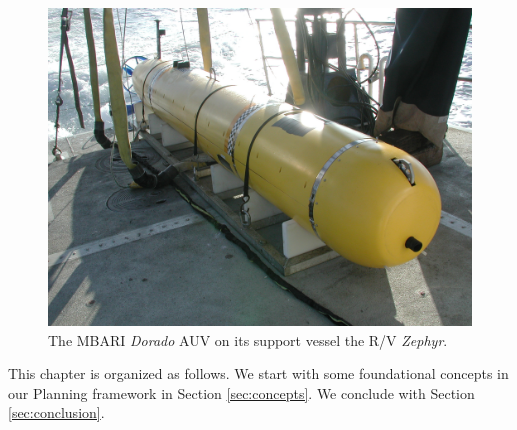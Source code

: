 \begin{figure}[t]
  \centering
  \vskip-5pt
  \includegraphics[scale=0.1]{figs/MBARI-AUV.jpg}
  \caption{\small The MBARI \emph{Dorado} AUV on its support vessel
    the R/V \emph{Zephyr}.}
  \label{fig:auv-fig}
  \vskip-0.3cm
\end{figure}

This chapter is organized as follows. We start with some foundational
concepts in our Planning framework in Section
\ref{sec:concepts}.  We conclude with Section
\ref{sec:conclusion}.
